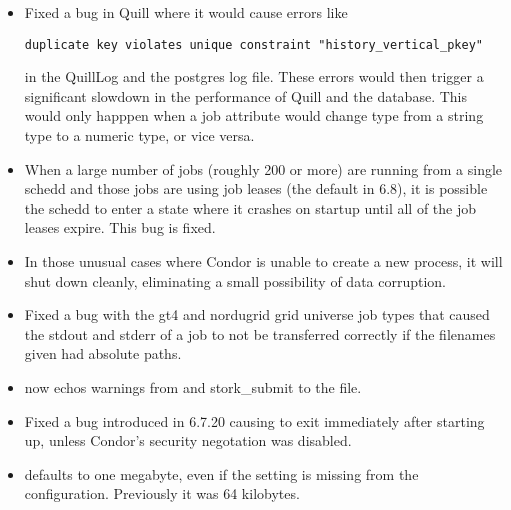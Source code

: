 \begin{itemize}

\item Fixed a bug in Quill where it would cause errors like
\begin{verbatim}
duplicate key violates unique constraint "history_vertical_pkey"
\end{verbatim}
in the QuillLog and the postgres log file.  These errors would then trigger
a significant slowdown in the performance of Quill and the database.  This
would only happpen when a job attribute would change type from a string
type to a numeric type, or vice versa.

\item When a large number of jobs (roughly 200 or more) are running from a
single schedd and those jobs are using job leases (the default in 6.8), it is
possible the schedd to enter a state where it crashes on startup until all of
the job leases expire.  This bug is fixed.

\item In those unusual cases where Condor is unable to create a new process,
it will shut down cleanly, eliminating a small possibility of data corruption.

\item Fixed a bug with the gt4 and nordugrid grid universe job types that
caused the stdout and stderr of a job to not be transferred correctly if
the filenames given had absolute paths.

\item {} now echos warnings from  and
stork\_submit to the  file.

\item Fixed a bug introduced in 6.7.20 causing 
to exit immediately after starting up, unless Condor's security
negotation was disabled.

\item {} defaults to one megabyte, even if the
setting is missing from the configuration.  Previously it was 64 kilobytes.

\end{itemize}


